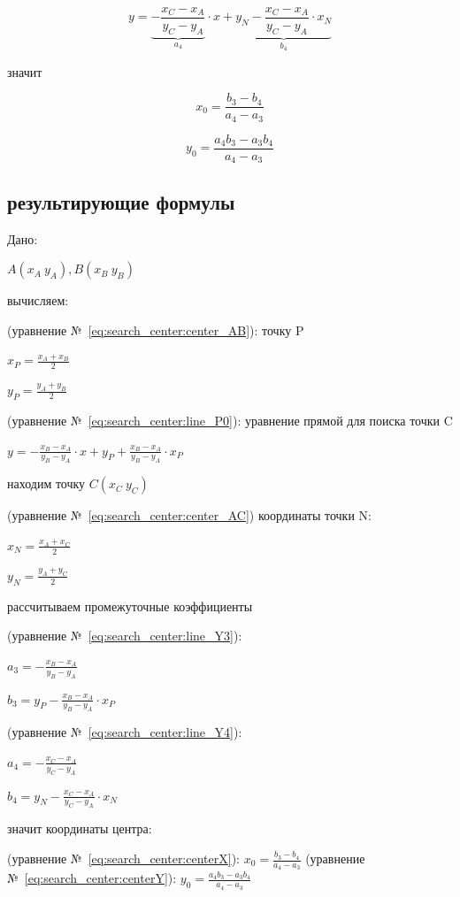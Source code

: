 \documentclass[unicode, 12pt, a4paper,oneside,fleqn]{article}
\begin{document}
\begin{equation}
\label{eq:search_center:line_Y4}
y = \underbrace{-\frac{x_C - x_A}{y_C - y_A}}_{a_4} \cdot x + \underbrace{y_N - \frac{x_C - x_A}{y_C - y_A} \cdot x_N}_{b_4}
\end{equation}

значит

\begin{equation}
\label{eq:search_center:centerX}
x_0 = \frac{b_3-b_4}{a_4-a_3}
\end{equation}

\begin{equation}
\label{eq:search_center:centerY}
y_0 = \frac{a_4b_3-a_3b_4}{a_4-a_3}
\end{equation}

\subsection{результирующие формулы}

Дано:

$A(x_A \  y_A), B(x_B \  y_B)$

вычисляем:

(уравнение №~\ref{eq:search_center:center_AB}): точку P

$x_P = \frac{x_A + x_B}{2}$

$y_P = \frac{y_A + y_B}{2}$

(уравнение №~\ref{eq:search_center:line_P0}): уравнение прямой для поиска точки C

$y = -\frac{x_B - x_A}{y_B - y_A} \cdot x + y_P + \frac{x_B - x_A}{y_B - y_A} \cdot x_P$

находим точку $C(x_C \  y_C)$

(уравнение №~\ref{eq:search_center:center_AC}) координаты точки N:

$x_N = \frac{x_A + x_C}{2}$ 

$y_N = \frac{y_A + y_C}{2}$



рассчитываем промежуточные коэффициенты

(уравнение №~\ref{eq:search_center:line_Y3}):

$a_3 = -\frac{x_B - x_A}{y_B - y_A}$

$b_3 = y_P - \frac{x_B - x_A}{y_B - y_A} \cdot x_P$

(уравнение №~\ref{eq:search_center:line_Y4}):

$a_4 = -\frac{x_C - x_A}{y_C - y_A}$

$b_4 = y_N - \frac{x_C - x_A}{y_C - y_A} \cdot x_N$

значит координаты центра:

(уравнение №~\ref{eq:search_center:centerX}): $x_0 = \frac{b_3-b_4}{a_4-a_3}$
(уравнение №~\ref{eq:search_center:centerY}): $y_0=\frac{a_4b_3-a_3b_4}{a_4-a_3}$
\end{document}
